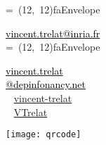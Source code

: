 \documentclass[10pt,A4]{article}
\newcommand*{\vcenteredhbox}[1]{\begingroup
\setbox0=\hbox{#1}\parbox{\wd0}{\box0}\endgroup}
\newcommand{\icon}[3] { 							
	\makebox(#2, #2){\textcolor{maincol}{\csname fa#1\endcsname}}
}
\newcommand{\icontext}[4]{ 						
	\vcenteredhbox{\icon{#1}{#2}{#3}}  \hspace{2pt}  \parbox{0.9\mpwidth}{\textcolor{#4}{#3}}
}
\newcommand{\iconemail}[5]{ 						
    \vcenteredhbox{\icon{#1}{#2}{#5}}  \hspace{2pt} \href{mailto:#4}{\textcolor{#5}{#3}}
}
\newcommand{\mpwidth}{\linewidth-\fboxsep-\fboxsep}
\newcommand{\cvtext}[1] {
	\begin{tabular*}{1\mpwidth}{p{0.98\mpwidth}}
		\parbox{1\mpwidth}{#1}
	\end{tabular*}
}
\newcommand{\cvsection}[1] {
	\vspace{5pt}
	\cvtext{
		\textbf{\Large{\textcolor{darkcol}{\uppercase{#1}}}}\\[-4pt]
		\textcolor{maincol}{ \rule{0.1\textwidth}{2pt} } \\
	}
}
\newcommand{\cvmetaevent}[4] {
	\textcolor{maincol} {\cvtext{\textbf{\begin{flushleft}#1\end{flushleft}}}}

	\ifthenelse{\isempty{#2}}{}{
	\textcolor{darkcol} {\cvtext{\textbf{#2}} }
	}

	\ifthenelse{\isempty{#3}}{}{
		\cvtext{{ \textcolor{darkcol} {#3} }}\\
	}

	\cvtext{#4}\\[14pt]
}
\newcommand{\cvqrcode}[1] {
	\begin{center}
		\texttt{[image: qrcode]}
	\end{center}
}
\begin{document}
\begin{paracol}{2}
\begin{leftcolumn}
\iconemail{Envelope}{12}{vincent.trelat@inria.fr}{vincent.trelat@inria.fr}{black}\\[4pt]
\iconemail{Envelope}{12}{vincent.trelat\\@depinfonancy.net}{vincent.trelat@depinfonancy.net}{black}\\[4pt]
{\color{maincol}\large~\faLinkedinSquare} \hspace{7pt} \href{https://www.linkedin.com/in/vincent-trelat/}{vincent-trelat}\\[4pt]
{\color{maincol}\large~\faGithub} \hspace{7pt} \href{https://www.github.com/VTrelat}{VTrelat}

\vfill\null
\cvqrcode{0.8}

%
%
%
%
%


\end{leftcolumn}
\end{paracol}
\end{document}

